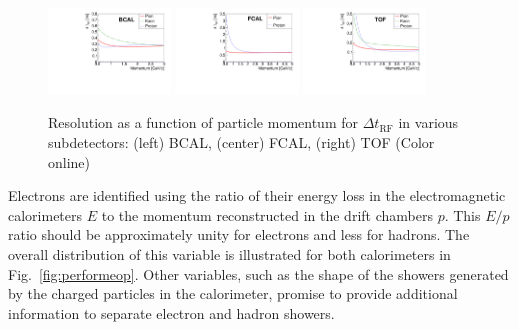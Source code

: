 \begin{figure}[tbp]
\begin{center}          
\includegraphics[width=0.29\textwidth]{figures/bcal_deltat_resol.pdf}
\includegraphics[width=0.29\textwidth]{figures/fcal_deltat_resol.pdf}
\includegraphics[width=0.29\textwidth]{figures/tof_deltat_resol.pdf}

\caption{\label{fig:timingresol}
Resolution as a function of particle momentum for  $\Delta t_\mathrm{RF}$ in various subdetectors: (left) BCAL, (center) FCAL, (right) TOF
 (Color online)}
\end{center}
\end{figure}


Electrons are identified using the ratio of their energy loss in the electromagnetic calorimeters $E$ to the momentum reconstructed in the drift chambers $p$.  This $E/p$ ratio should be approximately unity for electrons and less for hadrons.  The overall distribution of this variable is illustrated for both calorimeters in  Fig.~\ref{fig:performeop}.  Other variables, such as the shape of the showers generated by the charged particles in the calorimeter, promise to provide additional information to separate electron and hadron showers.


